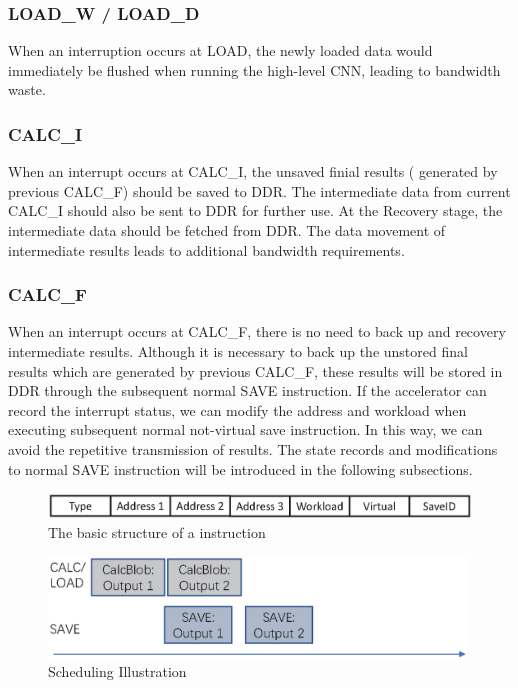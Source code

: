 \subsubsection{LOAD\_W / LOAD\_D }
When an interruption occurs at LOAD, the newly loaded data would immediately be flushed when running the high-level CNN, leading to bandwidth waste.

\subsubsection{CALC\_I} 
When an interrupt occurs at CALC\_I, the unsaved finial results ( generated by previous CALC\_F) should be saved to DDR. The intermediate data from current CALC\_I should also be sent to DDR for further use. At the Recovery stage, the intermediate data should be fetched from DDR. The data movement of intermediate results leads to additional bandwidth requirements.


\subsubsection{CALC\_F}
When an interrupt occurs at CALC\_F, there is no need to back up and recovery intermediate results. Although it is necessary to back up the unstored final results which are generated by previous CALC\_F, these results will be stored in DDR through the subsequent normal SAVE instruction.
If the accelerator can record the interrupt status, we can modify the address and workload when executing subsequent normal not-virtual save instruction.
In this way, we can avoid the repetitive transmission of results.
The state records and modifications to normal SAVE instruction will be introduced in the following subsections.

\begin{figure}[h]
	\centering
	\includegraphics[width=0.99\linewidth]{fig/virtual_instr.eps}
	\caption{The basic structure of a instruction }
	\label{fig:virtual_instr}
\end{figure}


\begin{figure}[t]
    \centering
	\includegraphics[width=0.99\textwidth]{fig/singlesave.eps} 	
    \caption{
		Scheduling Illustration
    }
	\label{fig:dslamresult}
\end{figure}

